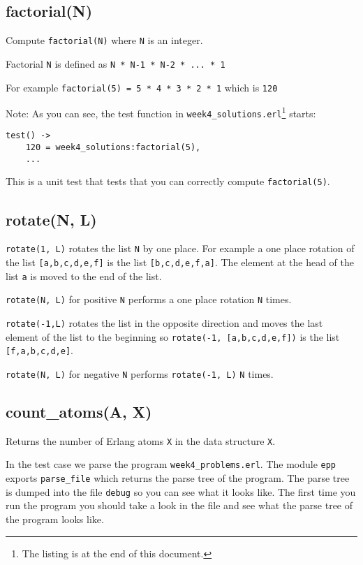 \documentclass[12pt]{article}
\begin{document}
\subsection{factorial(N)}

Compute \verb+factorial(N)+ where \verb+N+ is an integer.

Factorial \verb+N+ is defined as \verb+N * N-1 * N-2 * ... * 1+

For example \verb+factorial(5) = 5 * 4 * 3 * 2 * 1+ which is
\verb+120+

Note: As you can see, the test function in 
\verb+week4_solutions.erl+\footnote{The listing is at the end of this document.} 
starts:

\begin{Verbatim}[frame=single]
test() ->
    120 = week4_solutions:factorial(5),
    ...
\end{Verbatim}

This is a unit test that tests that you can correctly compute
\verb+factorial(5)+.

\subsection{rotate(N, L)}

\verb+rotate(1, L)+ rotates the list \verb+N+ by one place.
For example a one place rotation of the list \verb+[a,b,c,d,e,f]+ is the list
\verb+[b,c,d,e,f,a]+. The element at the head of the list \verb+a+ is moved
to the end of the list.

\verb+rotate(N, L)+ for positive \verb+N+ performs a one place rotation \verb+N+ times.

\verb+rotate(-1,L)+ rotates the list in the opposite direction and moves the
last element of the list to the beginning 
so  \verb+rotate(-1, [a,b,c,d,e,f])+ is the list
\verb+[f,a,b,c,d,e]+.

\verb+rotate(N, L)+ for negative \verb+N+ performs \verb+rotate(-1, L)+ \verb+N+ times.

\subsection{count\_atoms(A, X)}

Returns the number of Erlang atoms \verb+X+ in the data structure \verb+X+.

In the test case we parse the program \verb+week4_problems.erl+.  The
module \verb+epp+ exports \verb+parse_file+ which returns the parse
tree of the program. The parse tree is dumped into the file
\verb+debug+ so you can see what it looks like. The first time you run
the program you should take a look in the file and see what the parse
tree of the program looks like.
\end{document}
